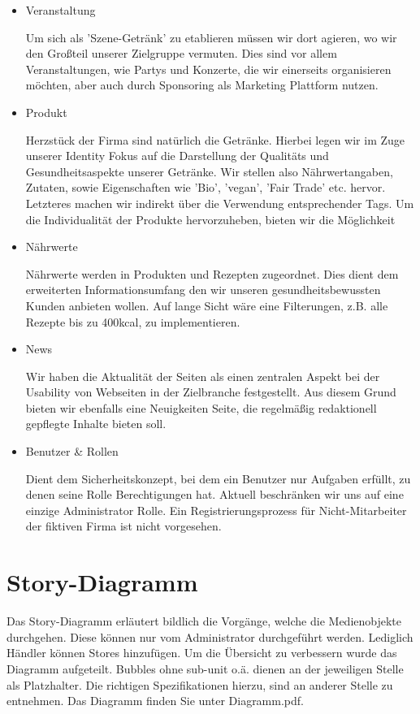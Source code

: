 \documentclass[12pt,a4paper,oneside,ngerman]{article}
\begin{document}
\begin{itemize}
\item Veranstaltung

Um sich als 'Szene-Getränk' zu etablieren müssen wir dort agieren, wo wir den Großteil unserer Zielgruppe vermuten.
Dies sind vor allem Veranstaltungen, wie Partys und Konzerte, die wir einerseits organisieren möchten, aber auch durch Sponsoring als Marketing Plattform nutzen.

\item Produkt

Herzstück der Firma sind natürlich die Getränke.
Hierbei legen wir im Zuge unserer Identity Fokus auf die Darstellung der Qualitäts und Gesundheitsaspekte unserer Getränke. 
Wir stellen also Nährwertangaben, Zutaten, sowie Eigenschaften wie 'Bio', 'vegan', 'Fair Trade' etc. hervor.
Letzteres machen wir indirekt über die Verwendung entsprechender Tags.
Um die Individualität der Produkte hervorzuheben, bieten wir die Möglichkeit 

\item Nährwerte

Nährwerte werden in Produkten und Rezepten zugeordnet. Dies dient dem erweiterten Informationsumfang den wir unseren gesundheitsbewussten Kunden anbieten wollen.
Auf lange Sicht wäre eine Filterungen, z.B. alle Rezepte bis zu 400kcal, zu implementieren.

\item News

Wir haben die Aktualität der Seiten als einen zentralen Aspekt bei der Usability von Webseiten in der Zielbranche festgestellt.
Aus diesem Grund bieten wir ebenfalls eine Neuigkeiten Seite, die regelmäßig redaktionell gepflegte Inhalte bieten soll.

\item Benutzer \& Rollen

Dient dem Sicherheitskonzept, bei dem ein Benutzer nur Aufgaben erfüllt, zu denen seine Rolle Berechtigungen hat. 
Aktuell beschränken wir uns auf eine einzige Administrator Rolle.
Ein Registrierungsprozess für Nicht-Mitarbeiter der fiktiven Firma ist nicht vorgesehen.

\end{itemize}


\section{Story-Diagramm} %

Das Story-Diagramm erläutert bildlich die Vorgänge, welche die Medienobjekte durchgehen.
Diese können nur vom Administrator durchgeführt werden. Lediglich Händler können Stores hinzufügen.
Um die Übersicht zu verbessern wurde das Diagramm aufgeteilt. Bubbles ohne sub-unit o.ä. dienen an der jeweiligen Stelle als Platzhalter. Die richtigen Spezifikationen hierzu, sind an anderer Stelle zu entnehmen. Das Diagramm finden Sie unter Diagramm.pdf.
\end{document}
